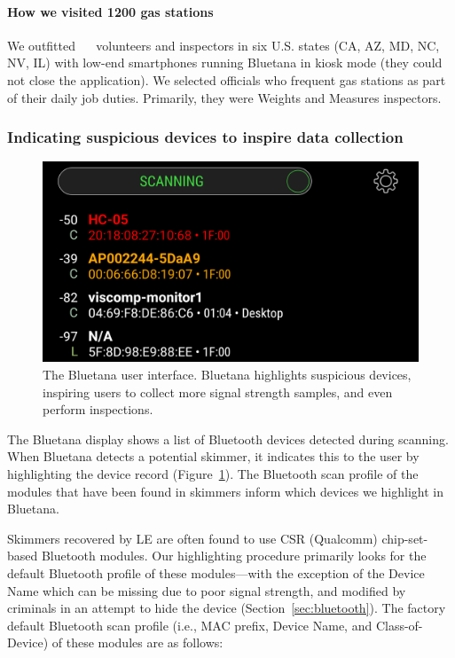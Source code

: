 \paragraph{How we visited 1200 gas stations}
%
We outfitted ~\numvolunteers~ volunteers and inspectors in six U.S. states (CA, AZ, MD, NC,
NV, IL) with low-end smartphones running Bluetana in kiosk mode (they could not
close the application).
%
We selected officials who frequent gas stations as part of their daily job
duties. Primarily, they were Weights and Measures inspectors.
%

\subsubsection*{Indicating suspicious devices to inspire data collection}

\begin{figure}
\centering
\includegraphics[width=\linewidth]{skimmer/fig/bluetana_screenshot}
\caption{
\label{fig:bluetana}
The Bluetana user interface. Bluetana highlights suspicious devices, inspiring users to collect more
signal strength samples, and even perform inspections.
}
\end{figure}



The Bluetana display shows a list of Bluetooth devices detected during scanning.
%
When Bluetana detects a potential skimmer, it indicates this to the user by
highlighting the device record (Figure~\ref{fig:bluetana}).
%
The Bluetooth scan profile of the modules that have been found in skimmers inform which devices we highlight in Bluetana.
 
Skimmers recovered by LE are often found to use CSR (Qualcomm) chip-set-based Bluetooth modules.
%
Our highlighting procedure primarily looks for the default Bluetooth profile of
these modules---with the exception of the Device Name which can be missing due to poor
signal strength, and modified by criminals in an attempt to hide the device (Section~\ref{sec:bluetooth}).
%
The factory default Bluetooth scan profile (i.e., MAC prefix, Device Name, and
Class-of-Device) of these modules are as follows:

